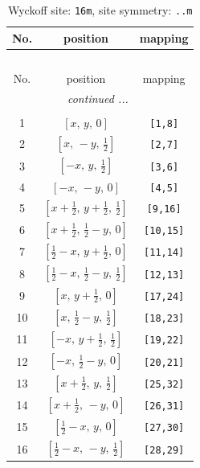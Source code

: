 \documentclass[fleqn,8pt]{jsarticle}
\begin{document}
\renewcommand{\arraystretch}{1.2}
\begin{longtable}{ccc}
\caption{Wyckoff site: {\tt 16m}, site symmetry: {\tt ..m}}
 \\
 \hline \hline
No. & position & mapping \\ \hline \endfirsthead

\multicolumn{2}{l}{\tablename\ \thetable{}} \\
 \hline \hline
No. & position & mapping \\ \hline \endhead

 \hline \hline
\multicolumn{2}{r}{\footnotesize\it continued ...} \\ \endfoot

 \hline \hline
\multicolumn{2}{r}{} \\ \endlastfoot

1 & $\left[ x,\, y,\, 0 \right]$ & {\tt [1,8]} \\ \hline
2 & $\left[ x,\, - y,\, \frac{1}{2} \right]$ & {\tt [2,7]} \\ \hline
3 & $\left[ - x,\, y,\, \frac{1}{2} \right]$ & {\tt [3,6]} \\ \hline
4 & $\left[ - x,\, - y,\, 0 \right]$ & {\tt [4,5]} \\ \hline
5 & $\left[ x + \frac{1}{2},\, y + \frac{1}{2},\, \frac{1}{2} \right]$ & {\tt [9,16]} \\ \hline
6 & $\left[ x + \frac{1}{2},\, \frac{1}{2} - y,\, 0 \right]$ & {\tt [10,15]} \\ \hline
7 & $\left[ \frac{1}{2} - x,\, y + \frac{1}{2},\, 0 \right]$ & {\tt [11,14]} \\ \hline
8 & $\left[ \frac{1}{2} - x,\, \frac{1}{2} - y,\, \frac{1}{2} \right]$ & {\tt [12,13]} \\ \hline
9 & $\left[ x,\, y + \frac{1}{2},\, 0 \right]$ & {\tt [17,24]} \\ \hline
10 & $\left[ x,\, \frac{1}{2} - y,\, \frac{1}{2} \right]$ & {\tt [18,23]} \\ \hline
11 & $\left[ - x,\, y + \frac{1}{2},\, \frac{1}{2} \right]$ & {\tt [19,22]} \\ \hline
12 & $\left[ - x,\, \frac{1}{2} - y,\, 0 \right]$ & {\tt [20,21]} \\ \hline
13 & $\left[ x + \frac{1}{2},\, y,\, \frac{1}{2} \right]$ & {\tt [25,32]} \\ \hline
14 & $\left[ x + \frac{1}{2},\, - y,\, 0 \right]$ & {\tt [26,31]} \\ \hline
15 & $\left[ \frac{1}{2} - x,\, y,\, 0 \right]$ & {\tt [27,30]} \\ \hline
16 & $\left[ \frac{1}{2} - x,\, - y,\, \frac{1}{2} \right]$ & {\tt [28,29]} \\
\end{longtable}
\end{document}
